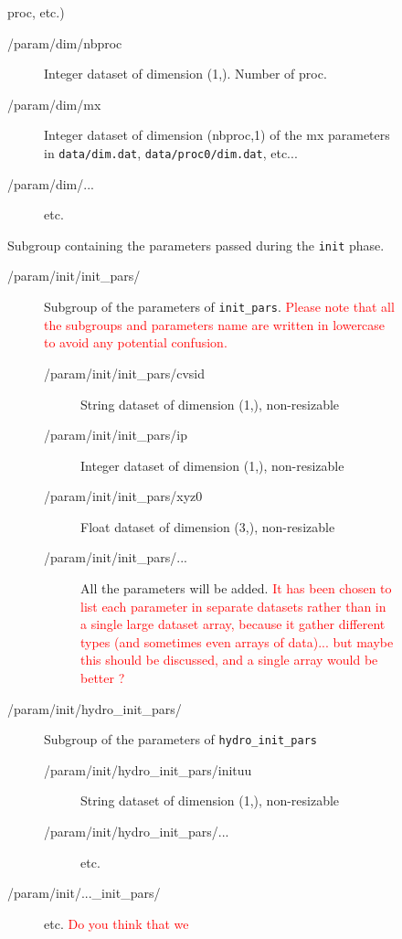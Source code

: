 \documentclass[a4paper,12pt]{article}
\newcommand{\note}[1]{\textcolor{red}{#1}}
\begin{document}
\begin{figure}[p]
{\begin{description}
\begin{description}
\begin{description}
      proc, etc.)
      \begin{description}
      \item[/param/dim/nbproc] Integer dataset of dimension
        (1,). Number of proc.
      \item[/param/dim/mx] Integer dataset of dimension (nbproc,1) of
        the mx parameters in \texttt{data/dim.dat},
        \texttt{data/proc0/dim.dat}, etc... 
      \item[/param/dim/...] etc.
      \end{description}
    \item[/param/init/] Subgroup containing the parameters
      passed during the \texttt{init} phase.
      \begin{description}
      \item[/param/init/init\_pars/]
        Subgroup of the parameters of
        \texttt{init\_pars}. \note{Please note that all the subgroups
          and parameters name are written in lowercase to avoid any
          potential confusion.}
        \begin{description}
          \item[/param/init/init\_pars/cvsid] String dataset of
            dimension (1,), non-resizable
          \item[/param/init/init\_pars/ip] Integer dataset of
            dimension (1,), non-resizable
          \item[/param/init/init\_pars/xyz0] Float dataset of
            dimension (3,), non-resizable
          \item[/param/init/init\_pars/...] All the parameters will be
            added. \note{It has been chosen to list each parameter in
            separate datasets rather than in a single large dataset
            array, because it gather different types (and sometimes
            even arrays of data)... but maybe this should be discussed,
            and a single array would be better ?}
        \end{description}
      \item[/param/init/hydro\_init\_pars/] Subgroup of the parameters
        of \texttt{hydro\_init\_pars}
        \begin{description}
        \item[/param/init/hydro\_init\_pars/inituu] String dataset of
            dimension (1,), non-resizable
        \item[/param/init/hydro\_init\_pars/...] etc.
        \end{description}
      \item[/param/init/...\_init\_pars/] etc. \note{Do you think that we
}
\end{description}
\end{description}
\end{description}
\end{description}}
\end{figure}
\end{document}
